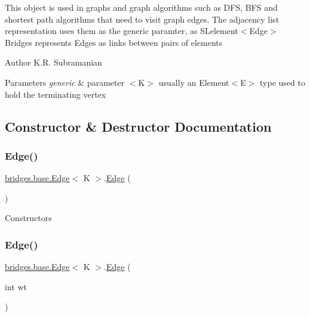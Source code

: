 This object is used in graphs and graph algorithms such as D\+FS, B\+FS and shortest path algorithms that need to visit graph edges. The adjacency list representation uses them as the generic paramter, as S\+Lelement$<$\+Edge$>$ Bridges represents Edges as links between pairs of elements

\begin{DoxyAuthor}{Author}
K.\+R. Subramanian
\end{DoxyAuthor}

\begin{DoxyParams}{Parameters}
{\em generic} & parameter $<$\+K$>$ usually an Element$<$\+E$>$ type used to hold the terminating vertex \\
\hline
\end{DoxyParams}


\subsection{Constructor \& Destructor Documentation}
\hypertarget{classbridges_1_1base_1_1_edge_a2535dd24e430ae90d2837db13824f8f2}{}\label{classbridges_1_1base_1_1_edge_a2535dd24e430ae90d2837db13824f8f2} 
\subsubsection{\texorpdfstring{Edge()}{Edge()}\hspace{0.1cm}{\footnotesize\ttfamily [1/3]}}
{\footnotesize\ttfamily \hyperlink{classbridges_1_1base_1_1_edge}{bridges.\+base.\+Edge}$<$ K $>$.\hyperlink{classbridges_1_1base_1_1_edge}{Edge} (\begin{DoxyParamCaption}{ }\end{DoxyParamCaption})}

Constructors \hypertarget{classbridges_1_1base_1_1_edge_a82c37eae608b774535c4bc79079cfeec}{}\label{classbridges_1_1base_1_1_edge_a82c37eae608b774535c4bc79079cfeec} 
\subsubsection{\texorpdfstring{Edge()}{Edge()}\hspace{0.1cm}{\footnotesize\ttfamily [2/3]}}
{\footnotesize\ttfamily \hyperlink{classbridges_1_1base_1_1_edge}{bridges.\+base.\+Edge}$<$ K $>$.\hyperlink{classbridges_1_1base_1_1_edge}{Edge} (\begin{DoxyParamCaption}\item[{int}]{wt }\end{DoxyParamCaption})}

